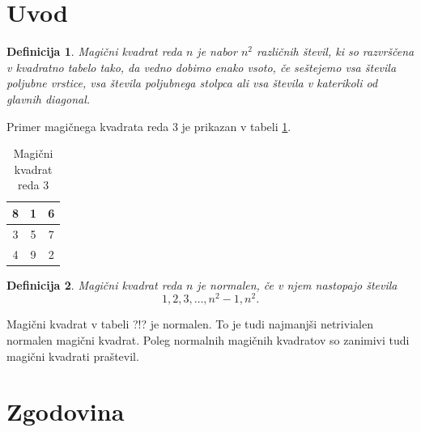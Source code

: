 \documentclass[a4paper,12pt]{article}
\newtheorem{definition}{Definicija}
\begin{document}
\section{Uvod}

\begin{definition}
   \emph{Magični kvadrat} reda $n$ je nabor $n^2$ različnih števil,
   ki so razvrščena v kvadratno tabelo tako, da vedno dobimo enako vsoto,
   če seštejemo vsa števila poljubne vrstice, vsa števila poljubnega
   stolpca ali vsa števila v katerikoli od glavnih diagonal.
\end{definition}

Primer magičnega kvadrata reda 3 je prikazan v tabeli \ref{table:mg3}.

\begin{table}[h!]
   \centering
   \caption{Magični kvadrat reda 3}
   \label{table:mg3}
   \begin{tabular}{|c|c|c|}
      \hline
      8 & 1 & 6 \\\hline
      3 & 5 & 7 \\\hline
      4 & 9 & 2 \\\hline
      \end{tabular}

\end{table}

\begin{definition}
   Magični kvadrat reda $n$ je \emph{normalen}, če v njem nastopajo števila
   \begin{equation}
      \label{eq:numbers}
      1, 2, 3, \ldots, n^2-1, n^2.
   \end{equation}
\end{definition}

Magični kvadrat v tabeli ?!? je normalen.
To je tudi najmanjši netrivialen normalen magični kvadrat.
Poleg normalnih magičnih kvadratov so zanimivi tudi magični kvadrati praštevil.


\section{Zgodovina}
\end{document}
